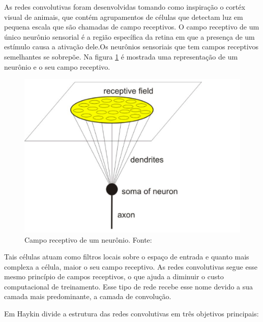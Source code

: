 As redes convolutivas  foram desenvolvidas tomando como inspiração o cortéx visual de animais, que contém  agrupamentos de células que detectam luz em pequena escala que são chamadas de campo receptivos. O campo receptivo de um único neurônio sensorial é a região específica da retina em que a presença de um estímulo causa a ativação dele.Os neurônios sensoriais que tem campos receptivos semelhantes se sobrepõe.
Na figura \ref{fig-campo} é mostrada uma representação de um neurônio e o seu campo receptivo. 
\begin{figure}[h]
	\centering
	\includegraphics[scale=0.4]{pasta1_figuras/campo_receptivo.png}
	\caption{Campo receptivo de um neurônio. Fonte: \cite{camporeceptivo}}
	
	\label{fig-campo}
\end{figure}

Tais células atuam como filtros locais sobre o espaço de entrada e quanto mais complexa a célula, maior o seu campo receptivo. As redes convolutivas segue esse mesmo princípio de campos receptivos, o que ajuda a diminuir o custo computacional de treinamento. Esse tipo de rede recebe esse nome devido a sua camada mais predominante, a camada de convolução.

Em \cite{haykin2009neural} Haykin divide a estrutura das redes convolutivas em três objetivos principais:

